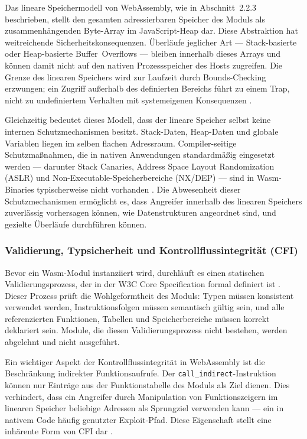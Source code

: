 Das lineare Speichermodell von WebAssembly, wie in Abschnitt~2.2.3 beschrieben, stellt den gesamten adressierbaren Speicher des Moduls als zusammenhängenden Byte-Array im JavaScript-Heap dar. Diese Abstraktion hat weitreichende Sicherheitskonsequenzen. Überläufe jeglicher Art --- Stack-basierte oder Heap-basierte Buffer~Overflows --- bleiben innerhalb dieses Arrays und können damit nicht auf den nativen Prozessspeicher des Hosts zugreifen. Die Grenze des linearen Speichers wird zur Laufzeit durch Bounds-Checking erzwungen; ein Zugriff außerhalb des definierten Bereichs führt zu einem Trap, nicht zu undefiniertem Verhalten mit systemeigenen Konsequenzen \cite{wasmcoreW3C}.

Gleichzeitig bedeutet dieses Modell, dass der lineare Speicher selbst keine internen Schutzmechanismen besitzt. Stack-Daten, Heap-Daten und globale Variablen liegen im selben flachen Adressraum. Compiler-seitige Schutzmaßnahmen, die in nativen Anwendungen standardmäßig eingesetzt werden --- darunter Stack Canaries, Address Space Layout Randomization (ASLR) und Non-Executable-Speicherbereiche (NX/DEP) --- sind in Wasm-Binaries typischerweise nicht vorhanden \cite{stiévenart2021securityrisklackingcompiler}. Die Abwesenheit dieser Schutzmechanismen ermöglicht es, dass Angreifer innerhalb des linearen Speichers zuverlässig vorhersagen können, wie Datenstrukturen angeordnet sind, und gezielte Überläufe durchführen können.

\subsubsection{Validierung, Typsicherheit und Kontrollflussintegrität (CFI)}

Bevor ein Wasm-Modul instanziiert wird, durchläuft es einen statischen Validierungsprozess, der in der W3C Core Specification formal definiert ist \cite{wasmcoreW3C}. Dieser Prozess prüft die Wohlgeformtheit des Moduls: Typen müssen konsistent verwendet werden, Instruktionsfolgen müssen semantisch gültig sein, und alle referenzierten Funktionen, Tabellen und Speicherbereiche müssen korrekt deklariert sein. Module, die diesen Validierungsprozess nicht bestehen, werden abgelehnt und nicht ausgeführt.

Ein wichtiger Aspekt der Kontrollflussintegrität in WebAssembly ist die Beschränkung indirekter Funktionsaufrufe. Der \texttt{call\_indirect}-Instruktion können nur Einträge aus der Funktionstabelle des Moduls als Ziel dienen. Dies verhindert, dass ein Angreifer durch Manipulation von Funktionszeigern im linearen Speicher beliebige Adressen als Sprungziel verwenden kann --- ein in nativem Code häufig genutzter Exploit-Pfad. Diese Eigenschaft stellt eine inhärente Form von CFI dar \cite{255318}.


